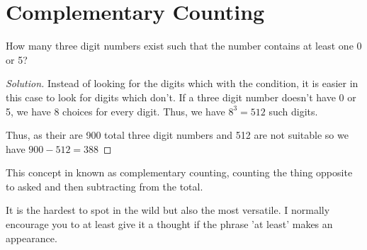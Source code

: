\section{Complementary Counting}
\begin{example}
     How many three digit numbers exist such that the number contains at least one 0 or 5?
\end{example}
\begin{proof}
    [Solution]
    Instead of looking for the digits which with the condition, it is easier in this case to look 
    for digits which don't. If a three digit number doesn't have 0 or 5, we have 8 choices for every 
    digit. Thus, we have $8^3=512$ such digits.\par
    Thus, as their are 900 total three digit numbers and 512 are not suitable so we have $900-512=388$
\end{proof}
This concept in known as complementary counting, counting the thing opposite to asked and then 
subtracting from the total. \par
It is the hardest to spot in the wild but also the most versatile. I normally encourage you 
to at least give it a thought if the phrase 'at least' makes an appearance.
